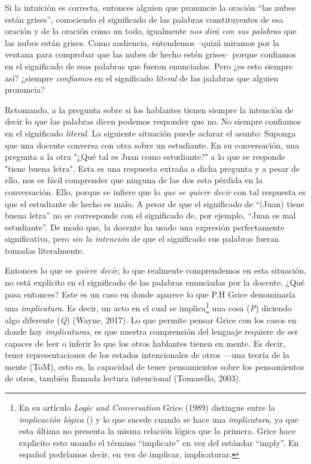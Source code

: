 \documentclass[]{book}
\begin{document}
Si la intuición es correcta, entonces alguien que pronuncie la oración
``las nubes están grises'', conociendo el significado de las palabras
constituyentes de esa oración y de la oración como un todo, igualmente
\emph{nos dirá con sus palabras} que las nubes están grises. Como
audiencia, entendemos --quizá miramos por la ventana para comprobar que
las nubes de hecho estén grises-- porque confiamos en el significado de
esas palabras que fueron enunciadas. Pero ¿es esto siempre así? ¿siempre
\emph{confiamos} en el significado \emph{literal} de las palabras que
alguien pronuncia?

Retomando, a la pregunta sobre si los hablantes tienen siempre la
intención de decir lo que las palabras dicen podemos responder que no.
No siempre confiamos en el significado \emph{literal}. La siguiente
situación puede aclarar el asunto: Suponga que una docente conversa con
otra sobre un estudiante. En su conversación, una pregunta a la otra
"¿Qué tal es Juan como estudiante?" a lo que se responde "tiene buena
letra". Esta es una respuesta extraña a dicha pregunta y a pesar de
ello, nos es fácil comprender que ninguna de las dos esta pérdida en la
conversación. Ello, porque se infiere que lo \emph{que se quiere decir}
con tal respuesta es que el estudiante de hecho es malo. A pesar de que
el significado de ``(Juan) tiene buena letra'' no se corresponde con el
significado de, por ejemplo, ``Juan es mal estudiante''. De modo que, la
docente ha usado una expresión perfectamente significativa, pero
\emph{sin la intención} de que el significado sus palabras fueran
tomadas literalmente.

Entonces lo que se \emph{quiere decir}, lo que realmente comprendemos en
esta situación, no está explícito en el significado de las palabras
enunciadas por la docente. ¿Qué pasa entonces? Este es un caso en donde
aparece lo que P.H Grice denominaría una \emph{implicatura}. Es decir,
un acto en el cual se implica\footnote{En su artículo \emph{Logic and
  Conversation} Grice (1989) distingue entre la \emph{implicación
  lógica} () y lo que sucede cuando se hace una \emph{implicatura}, ya
  que esta última no presenta la misma relación lógica que la primera.
  Grice hace explicito esto usando el término ``implicate'' en vez del
  estándar ``imply''. En español podríamos decir, en vez de implicar,
  implicaturar.} una cosa (\emph{P}) diciendo algo diferente (\emph{Q})
(Wayne, 2017). Lo que permite pensar Grice con los casos en donde hay
\emph{implicaturas}, es que nuestra comprensión del lenguaje requiere de
ser capaces de leer o inferir lo que los otros hablantes tienen en
mente. Es decir, tener representaciones de los estados intencionales de
otros ---una teoría de la mente (ToM), esto es, la capacidad de tener
pensamientos sobre los pensamientos de otros, también llamada lectura
intencional (Tomasello, 2003).
\end{document}
